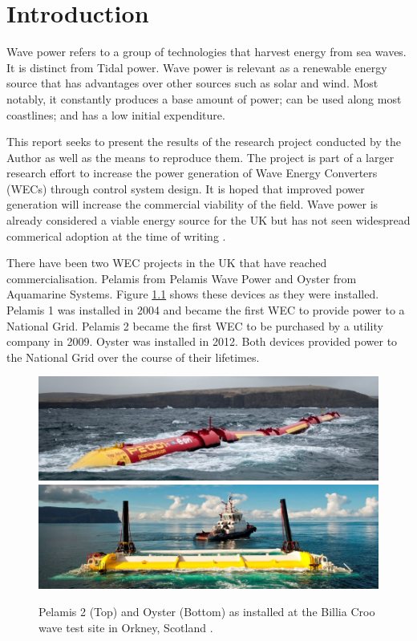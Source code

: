 \documentclass{report}
\begin{document}
\printnomenclature

\chapter{Introduction}
Wave power refers to a group of technologies that harvest energy from sea waves. It is distinct from Tidal power. Wave power is relevant as a renewable energy source that has advantages over other sources such as solar and wind. Most notably, it constantly produces a base amount of power; can be used along most coastlines; and has a low initial expenditure. \cite{carbonTrust}

This report seeks to present the results of the research project conducted by the Author as well as the means to reproduce them. The project is part of a larger research effort to increase the power generation of Wave Energy Converters (WECs) through control system design. It is hoped that improved power generation will increase the commercial viability of the field. Wave power is already considered a viable energy source for the UK \cite{carbonTrust} but has not seen widespread commerical adoption at the time of writing \cite{europeanMarineEnergyCenter}.

There have been two WEC projects in the UK that have reached commercialisation. Pelamis from Pelamis Wave Power and Oyster from Aquamarine Systems\cite{europeanMarineEnergyCenter}. Figure \ref{previousWECs} shows these devices as they were installed. Pelamis 1 was installed in 2004 and became the first WEC to provide power to a National Grid. Pelamis 2 became the first WEC to be purchased by a utility company in 2009. Oyster was installed in 2012. Both devices provided power to the National Grid over the course of their lifetimes.

\begin{figure}
\centering
\includegraphics[height=0.2\textwidth]{graphics/pelamis}
\includegraphics[height=0.2\textwidth]{graphics/oyster}
\caption{Pelamis 2 (Top) and Oyster (Bottom) as installed at the Billia Croo wave test site in Orkney, Scotland \cite{europeanMarineEnergyCenter}.}
\label{previousWECs}
\end{figure}
\end{document}
